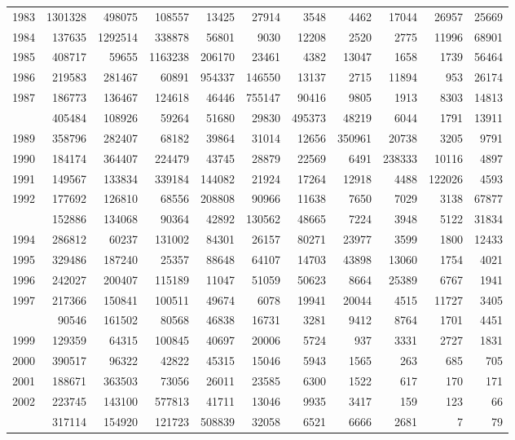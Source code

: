 \documentclass[
]{article}
\begin{document}
\begin{longtable}[t]{lrrrrrrrrrr}
1983 & 1301328 & 498075 & 108557 & 13425 & 27914 & 3548 & 4462 & 17044 & 26957 & 25669\\
1984 & 137635 & 1292514 & 338878 & 56801 & 9030 & 12208 & 2520 & 2775 & 11996 & 68901\\
1985 & 408717 & 59655 & 1163238 & 206170 & 23461 & 4382 & 13047 & 1658 & 1739 & 56464\\
1986 & 219583 & 281467 & 60891 & 954337 & 146550 & 13137 & 2715 & 11894 & 953 & 26174\\
1987 & 186773 & 136467 & 124618 & 46446 & 755147 & 90416 & 9805 & 1913 & 8303 & 14813\\
\addlinespace
1988 & 405484 & 108926 & 59264 & 51680 & 29830 & 495373 & 48219 & 6044 & 1791 & 13911\\
1989 & 358796 & 282407 & 68182 & 39864 & 31014 & 12656 & 350961 & 20738 & 3205 & 9791\\
1990 & 184174 & 364407 & 224479 & 43745 & 28879 & 22569 & 6491 & 238333 & 10116 & 4897\\
1991 & 149567 & 133834 & 339184 & 144082 & 21924 & 17264 & 12918 & 4488 & 122026 & 4593\\
1992 & 177692 & 126810 & 68556 & 208808 & 90966 & 11638 & 7650 & 7029 & 3138 & 67877\\
\addlinespace
1993 & 152886 & 134068 & 90364 & 42892 & 130562 & 48665 & 7224 & 3948 & 5122 & 31834\\
1994 & 286812 & 60237 & 131002 & 84301 & 26157 & 80271 & 23977 & 3599 & 1800 & 12433\\
1995 & 329486 & 187240 & 25357 & 88648 & 64107 & 14703 & 43898 & 13060 & 1754 & 4021\\
1996 & 242027 & 200407 & 115189 & 11047 & 51059 & 50623 & 8664 & 25389 & 6767 & 1941\\
1997 & 217366 & 150841 & 100511 & 49674 & 6078 & 19941 & 20044 & 4515 & 11727 & 3405\\
\addlinespace
1998 & 90546 & 161502 & 80568 & 46838 & 16731 & 3281 & 9412 & 8764 & 1701 & 4451\\
1999 & 129359 & 64315 & 100845 & 40697 & 20006 & 5724 & 937 & 3331 & 2727 & 1831\\
2000 & 390517 & 96322 & 42822 & 45315 & 15046 & 5943 & 1565 & 263 & 685 & 705\\
2001 & 188671 & 363503 & 73056 & 26011 & 23585 & 6300 & 1522 & 617 & 170 & 171\\
2002 & 223745 & 143100 & 577813 & 41711 & 13046 & 9935 & 3417 & 159 & 123 & 66\\
\addlinespace
2003 & 317114 & 154920 & 121723 & 508839 & 32058 & 6521 & 6666 & 2681 & 7 & 79\\

\end{longtable}
\end{document}
